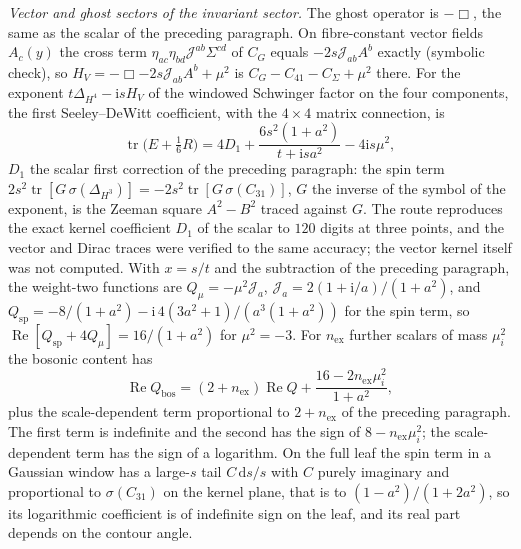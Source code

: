 \emph{Vector and ghost sectors of the invariant sector.} The ghost operator is \(-\Box\), the same as the scalar of the preceding paragraph. On fibre-constant vector fields \(A_c(y)\) the cross term \(\eta_{ac}\eta_{bd}\mathcal J^{ab}\Sigma^{cd}\) of \(C_G\) equals \(-2s\mathcal J_{ab}A^b\) exactly (symbolic check), so \(H_V=-\Box-2s\mathcal J_{ab}A^b+\mu^2\) is \(C_G-C_{41}-C_\Sigma+\mu^2\) there. For the exponent \(t\Delta_{H^4}-\mathrm isH_V\) of the windowed Schwinger factor on the four components, the first Seeley--DeWitt coefficient, with the \(4\times4\) matrix connection, is
\[
  \operatorname{tr}\bigl(E+\tfrac16R\bigr)=4D_1+\frac{6s^2(1+a^2)}{t+\mathrm isa^2}-4\mathrm is\mu^2,
\]
\(D_1\) the scalar first correction of the preceding paragraph: the spin term \(2s^2\operatorname{tr}[G\,\sigma(\Delta_{H^3})]=-2s^2\operatorname{tr}[G\,\sigma(C_{31})]\), \(G\) the inverse of the symbol of the exponent, is the Zeeman square \(A^2-B^2\) traced against \(G\). The route reproduces the exact kernel coefficient \(D_1\) of the scalar to \(120\) digits at three points, and the vector and Dirac traces were verified to the same accuracy; the vector kernel itself was not computed. With \(x=s/t\) and the subtraction of the preceding paragraph, the weight-two functions are \(Q_\mu=-\mu^2\mathcal J_a\), \(\mathcal J_a=2(1+\mathrm i/a)/(1+a^2)\), and \(Q_{\mathrm{sp}}=-8/(1+a^2)-\mathrm i\,4(3a^2+1)/(a^3(1+a^2))\) for the spin term, so \(\operatorname{Re}[Q_{\mathrm{sp}}+4Q_{\mu}]=16/(1+a^2)\) for \(\mu^2=-3\). For \(n_{\mathrm{ex}}\) further scalars of mass \(\mu_i^2\) the bosonic content has
\[
  \operatorname{Re}Q_{\mathrm{bos}}=(2+n_{\mathrm{ex}})\operatorname{Re}Q+\frac{16-2n_{\mathrm{ex}}\mu_i^2}{1+a^2},
\]
plus the scale-dependent term proportional to \(2+n_{\mathrm{ex}}\) of the preceding paragraph. The first term is indefinite and the second has the sign of \(8-n_{\mathrm{ex}}\mu_i^2\); the scale-dependent term has the sign of a logarithm. On the full leaf the spin term in a Gaussian window has a large-\(s\) tail \(C\,\mathrm ds/s\) with \(C\) purely imaginary and proportional to \(\sigma(C_{31})\) on the kernel plane, that is to \((1-a^2)/(1+2a^2)\), so its logarithmic coefficient is of indefinite sign on the leaf, and its real part depends on the contour angle.

